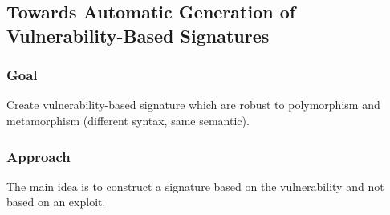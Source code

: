 \documentclass[10pt, a4paper]{article}
\begin{document}
\subsection{\cite{BNS-SP06} Towards Automatic Generation of Vulnerability-Based Signatures} 

\subsubsection{Goal}
Create vulnerability-based signature which are robust to polymorphism and metamorphism (different syntax, same semantic).

\subsubsection{Approach}
The main idea is to construct a signature based on the vulnerability and not based on an exploit. 
\end{document}
